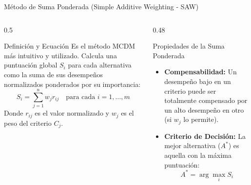 \documentclass[aspectratio=169, 10pt]{beamer}
\begin{document}
\begin{frame}{Método de Suma Ponderada (Simple Additive Weighting - SAW)}
    \begin{columns}
        \begin{column}{0.5\textwidth}
            \begin{block}{Definición y Ecuación}
                Es el método MCDM más intuitivo y utilizado. Calcula una puntuación global $S_i$ para cada alternativa como la suma de sus desempeños normalizados ponderados por su importancia:
                \begin{equation*}
                    S_i = \sum_{j=1}^n w_j r_{ij} \quad \text{para cada } i = 1, \dots, m
                \end{equation*}
                Donde $r_{ij}$ es el valor normalizado y $w_j$ es el peso del criterio $C_j$.
            \end{block}
        \end{column}
        
        \begin{column}{0.48\textwidth}
            \begin{exampleblock}{Propiedades de la Suma Ponderada}
                \scriptsize
                \begin{itemize}
                    \item \textbf{Compensabilidad:} Un desempeño bajo en un criterio puede ser totalmente compensado por un alto desempeño en otro (si $w_j$ lo permite).
                    \item \textbf{Criterio de Decisión:} La mejor alternativa ($A^*$) es aquella con la máxima puntuación:
                        \begin{equation*}
                            A^* = \arg\max_i S_i
                        \end{equation*}
                \end{itemize}
            \end{exampleblock}
        \end{column}
    \end{columns}
\end{frame}
\end{document}
